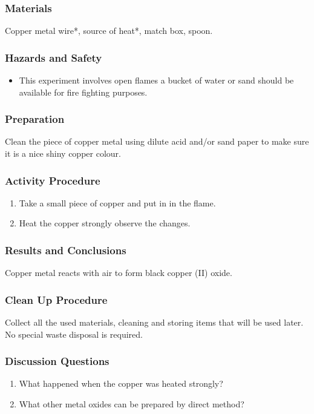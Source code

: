 \subsubsection*{Materials}
Copper metal wire*, source of heat*, match box, spoon.

\subsubsection*{Hazards and Safety}
\begin{itemize}
\item{This experiment involves open flames a bucket of water or sand should be available for fire fighting purposes.}
\end{itemize}
\subsubsection*{Preparation}
Clean the piece of copper metal using dilute acid and/or sand paper to make sure it is a nice shiny copper colour.
\subsubsection*{Activity Procedure}
\begin{enumerate}
\item{Take a small piece of copper and put in in the flame.}
\item{Heat the copper strongly observe the changes.}
\end{enumerate}

\subsubsection*{Results and Conclusions}
Copper metal reacts with air to form black copper (II) oxide.

\subsubsection*{Clean Up Procedure}
Collect all the used materials, cleaning and storing items that will be used later. No special waste disposal is required.

\subsubsection*{Discussion Questions}
\begin{enumerate}
\item{What happened when the copper was heated strongly?}
\item{What other metal oxides can be prepared by direct method?}
\end{enumerate}
